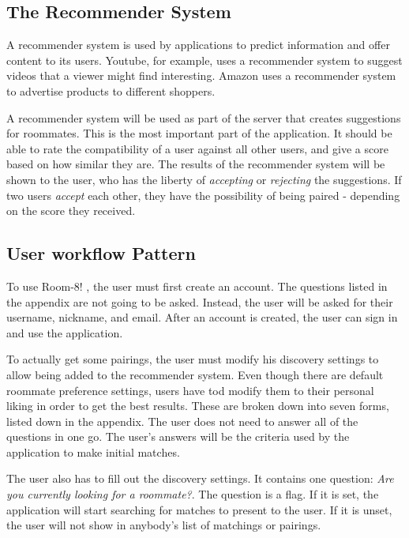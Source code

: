 \documentclass[journal]{./IEEE/IEEEtran}
\newcommand{\APPNAME}{Room-8! }
\begin{document}
\subsection{The Recommender System}
A recommender system is used by applications to predict information and offer content to its users\cite{katarya}.
Youtube, for example, uses a recommender system to suggest videos that a viewer might find interesting. Amazon uses a
recommender system to advertise products to different shoppers.

A recommender system will be used as part of the server that creates suggestions for roommates. This is the most
important part of the application. It should be able to rate the compatibility of a user against all other users, and
give a score based on how similar they are. The results of the recommender system will be shown to the user, who has the
liberty of \textit{accepting} or \textit{rejecting} the suggestions. If two users \textit{accept} each other, they have
the possibility of being paired - depending on the score they received.

\subsection{User workflow Pattern}

To use \APPNAME , the user must first create an account. The questions listed in the appendix are not going to be asked.
Instead, the user will be asked for their username, nickname, and email. After an account is created, the
user can sign in and use the application.

To actually get some pairings, the user must modify his discovery settings to allow being added to the recommender
system. Even though there are default roommate preference settings, users have tod modify them to their personal liking
in order to get the best results. These are broken down into seven forms, listed down in the appendix. The user does not
need to answer all of the questions in one go. The user's answers will be the criteria used by the application to make
initial matches. 

The user also has to fill out the discovery settings. It contains one question: \textit{Are you currently looking for a
roommate?}. The question is a flag. If it is set, the application will start searching for matches to present to the
user. If it is unset, the user will not show in anybody's list of matchings or pairings.
\end{document}
